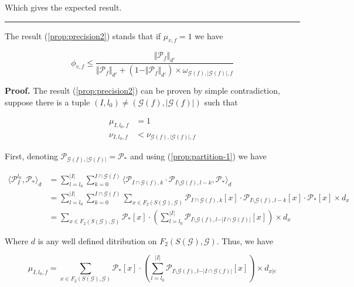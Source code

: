 \documentclass[a4paper, 11pt]{article}
\begin{document}
Which gives the expected result.

\begin{center}
\rule[0pt]{100pt}{1pt} 
\end{center}

The result (\ref{prop:precision2}) stands that if $\mu_{v, f} = 1$ we have

\begin{equation*}
\phi_{v, f} \leq \frac{\Vert \mathcal{P}_{f} \Vert_{d'}}{\Vert \mathcal{P}_{f} \Vert_{d'} + (1 - \Vert \mathcal{P}_{f} \Vert_{d'}) \times \omega_{\mathcal{G}(f),\vert \mathcal{G}(f) \vert, f}} 
\end{equation*}

\textbf{Proof.} The result (\ref{prop:precision2}) can be proven by simple contradiction, suppose there is a tuple $(I, l_0) \neq (\mathcal{G}(f), \vert \mathcal{G}(f) \vert)$ such that 

\begin{align*}
\mu_{I, l_0, f} &= 1 \\
\nu_{I, l_0, f} &< \nu_{\mathcal{G}(f), \vert \mathcal{G}(f) \vert, f}
\end{align*}

First, denoting $\mathcal{P}_{\mathcal{G}(f),\vert \mathcal{G}(f) \vert} = \mathcal{P}_{*}$ and using (\ref{prop:partition-1}) we have

\begin{align*}
\langle  \mathcal{P}_{I}^{l_0}, \mathcal{P}_{*}\rangle_{d} &=\sum_{l=l_0}^{\vert I \vert} \sum_{k=0}^{I\cap \mathcal{G}(f)} \langle \mathcal{P}_{I\cap \mathcal{G}(f), k} \cdot  \mathcal{P}_{I\setminus \mathcal{G}(f), l-k}, \mathcal{P}_{*} \rangle_{d} \\
&= \sum_{l=l_0}^{\vert I \vert} \sum_{k=0}^{I\cap \mathcal{G}(f)} \sum_{x \in F_2(S(\mathcal{G}), \mathcal{G})} \mathcal{P}_{I\cap \mathcal{G}(f), k}[x] \cdot  \mathcal{P}_{I\setminus \mathcal{G}(f), l-k} [x] \cdot \mathcal{P}_{*}[x] \times d_{x}\\
&= \sum_{x \in F_2(S(\mathcal{G}), \mathcal{G})}  \mathcal{P}_{*}[x] \cdot \left( \sum_{l=l_0}^{\vert I \vert} \mathcal{P}_{I\setminus \mathcal{G}(f), l-\vert I \cap \mathcal{G}(f)\vert} [x] \right) \times d_{x}
\end{align*}

Where $d$ is any well defined ditribution on $F_2(S(\mathcal{G}), \mathcal{G})$. Thus, we have 

\begin{equation*}
\mu_{I, l_0, f} = \sum_{x \in F_2(S(\mathcal{G}), \mathcal{G})}  \mathcal{P}_{*}[x] \cdot \left( \sum_{l=l_0}^{\vert I \vert} \mathcal{P}_{I\setminus \mathcal{G}(f), l-\vert I \cap \mathcal{G}(f)\vert} [x] \right) \times d_{x \vert e}
\end{equation*}
\end{document}
